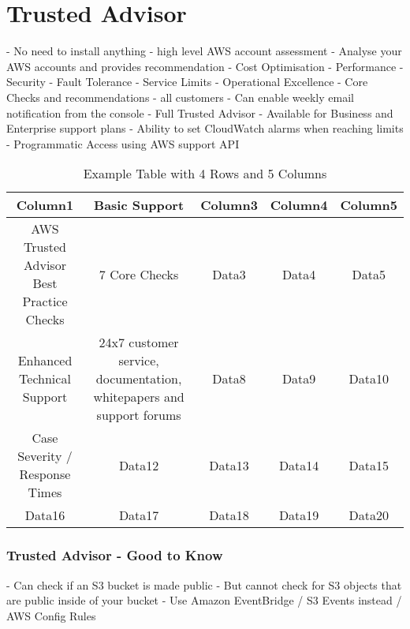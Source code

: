 \documentclass[11pt]{book}
\begin{document}
    \section{Trusted Advisor}
    - No need to install anything - high level AWS account assessment
    - Analyse your AWS accounts and provides recommendation
    - Cost Optimisation
    - Performance
    - Security
    - Fault Tolerance
    - Service Limits
    - Operational Excellence
    - Core Checks and recommendations - all customers
    - Can enable weekly email notification from the console
    - Full Trusted Advisor - Available for Business and Enterprise support plans
    - Ability to set CloudWatch alarms when reaching limits
    - Programmatic Access using AWS support API

    \begin{table}[h!]
        \centering
        \begin{tabular}{|c|c|c|c|c|}
            \hline
            Column1                                  & Basic Support                                                        & Column3 & Column4 & Column5 \\ \hline
            AWS Trusted Advisor Best Practice Checks & 7 Core Checks                                                        & Data3   & Data4   & Data5   \\ \hline
            Enhanced Technical Support               & 24x7 customer service, documentation, whitepapers and support forums  & Data8   & Data9   & Data10  \\ \hline
            Case Severity / Response Times           & Data12                                                               & Data13  & Data14  & Data15  \\ \hline
            Data16                                   & Data17                                                               & Data18  & Data19  & Data20  \\ \hline
        \end{tabular}
        \caption{Example Table with 4 Rows and 5 Columns}
        \label{tab:example_table}
    \end{table}

    \subsubsection{Trusted Advisor - Good to Know}
    - Can check if an S3 bucket is made public
    - But cannot check for S3 objects that are public inside of your bucket
    - Use Amazon EventBridge / S3 Events instead / AWS Config Rules
\end{document}
